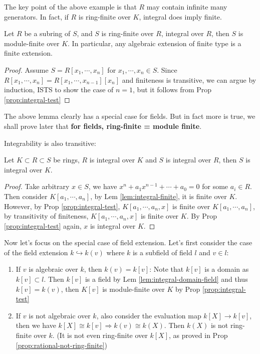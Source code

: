 \documentclass{note-eng}
\begin{document}
The key point of the above example is that $R$ may contain infinite many generators. In fact, if $R$ is ring-finite over $K$, integral does imply finite.

\begin{lemma} [Integral + Ring-finite = Module-finite]\label{lem:integral-finite}
    Let $R$ be a subring of $S$, and $S$ is ring-finite over $R$, integral over $R$, then $S$ is module-finite over $K$. In particular, any algebraic extension of finite type is a finite extension.
\end{lemma}

\begin{proof}
    Assume $S = R[x_1, \cdots, x_n]$ for $x_1, \cdots, x_n \in S$. Since $R[x_1, \cdots, x_n] = R[x_1, \cdots, x_{n - 1}][x_n]$ and finiteness is transitive, we can argue by induction, ISTS to show the case of $n = 1$, but it follows from Prop \ref{prop:integral-test}
\end{proof}

The above lemma clearly has a special case for fields. But in fact more is true, we shall prove later that \textbf{for fields, ring-finite = module finite}.

Integrability is also transitive:

\begin{proposition}
    Let $K \subset R \subset S$ be rings, $R$ is integral over $K$ and $S$ is integral over $R$, then $S$ is integral over $K$.
\end{proposition}

\begin{proof}
    Take arbitrary $x \in S$, we have $x^n + a_1x^{n - 1} + \cdots + a_0 = 0$ for some $a_i \in R$. Then consider $K[a_1, \cdots, a_n]$, by Lem \ref{lem:integral-finite}, it is finite over $K$. However, by Prop \ref{prop:integral-test}, $K[a_1, \cdots, a_n, x]$ is finite over $K[a_1, \cdots, a_n]$, by transitivity of finiteness, $K[a_1, \cdots, a_n, x]$ is finite over $K$. By Prop \ref{prop:integral-test} again, $x$ is integral over $K$.
\end{proof}

Now let's focus on the special case of field extension. Let's first consider the case of the field extension $k \hookrightarrow k(v)$ where $k$ is a subfield of field $l$ and $v \in l$:

\begin{enumerate}
    \item If $v$ is algebraic over $k$, then $k(v) = k[v]$: Note that $k[v]$ is a domain as $k[v] \subset l$. Then $k[v]$ is a field by Lem \ref{lem:integral-domain-field} and thus $k[v] = k(v)$, then $K[v]$ is module-finite over $K$ by Prop \ref{prop:integral-test}
    \item If $v$ is not algebraic over $k$, also consider the evaluation map $k[X] \rightarrow k[v]$, then we have $k[X] \cong k[v] \Rightarrow k(v) \cong k(X)$. Then $k(X)$ is not ring-finite over $k$. (It is not even ring-finite over $k[X]$, as proved in Prop \ref{prop:rational-not-ring-finite})
\end{enumerate}
\end{document}
